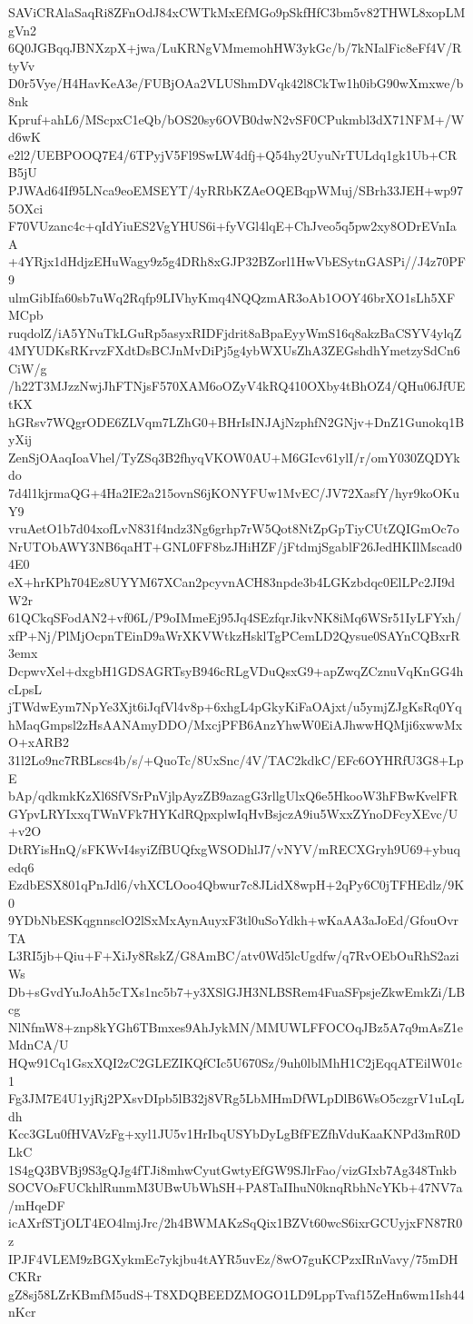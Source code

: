 SAViCRAlaSaqRi8ZFnOdJ84xCWTkMxEfMGo9pSkfHfC3bm5v82THWL8xopLMgVn2
6Q0JGBqqJBNXzpX+jwa/LuKRNgVMmemohHW3ykGc/b/7kNIalFic8eFf4V/RtyVv
D0r5Vye/H4HavKeA3e/FUBjOAa2VLUShmDVqk42l8CkTw1h0ibG90wXmxwe/b8nk
Kpruf+ahL6/MScpxC1eQb/bOS20sy6OVB0dwN2vSF0CPukmbl3dX71NFM+/Wd6wK
e2l2/UEBPOOQ7E4/6TPyjV5Fl9SwLW4dfj+Q54hy2UyuNrTULdq1gk1Ub+CRB5jU
PJWAd64If95LNca9eoEMSEYT/4yRRbKZAeOQEBqpWMuj/SBrh33JEH+wp975OXci
F70VUzanc4c+qIdYiuES2VgYHUS6i+fyVGl4lqE+ChJveo5q5pw2xy8ODrEVnIaA
+4YRjx1dHdjzEHuWagy9z5g4DRh8xGJP32BZorl1HwVbESytnGASPi//J4z70PF9
ulmGibIfa60sb7uWq2Rqfp9LIVhyKmq4NQQzmAR3oAb1OOY46brXO1sLh5XFMCpb
ruqdolZ/iA5YNuTkLGuRp5asyxRIDFjdrit8aBpaEyyWmS16q8akzBaCSYV4ylqZ
4MYUDKsRKrvzFXdtDsBCJnMvDiPj5g4ybWXUsZhA3ZEGshdhYmetzySdCn6CiW/g
/h22T3MJzzNwjJhFTNjsF570XAM6oOZyV4kRQ410OXby4tBhOZ4/QHu06JfUEtKX
hGRsv7WQgrODE6ZLVqm7LZhG0+BHrIsINJAjNzphfN2GNjv+DnZ1Gunokq1ByXij
ZenSjOAaqIoaVhel/TyZSq3B2fhyqVKOW0AU+M6GIcv61ylI/r/omY030ZQDYkdo
7d4l1kjrmaQG+4Ha2IE2a215ovnS6jKONYFUw1MvEC/JV72XasfY/hyr9koOKuY9
vruAetO1b7d04xofLvN831f4ndz3Ng6grhp7rW5Qot8NtZpGpTiyCUtZQIGmOc7o
NrUTObAWY3NB6qaHT+GNL0FF8bzJHiHZF/jFtdmjSgablF26JedHKIlMscad04E0
eX+hrKPh704Ez8UYYM67XCan2pcyvnACH83npde3b4LGKzbdqc0ElLPc2JI9dW2r
61QCkqSFodAN2+vf06L/P9oIMmeEj95Jq4SEzfqrJikvNK8iMq6WSr51IyLFYxh/
xfP+Nj/PlMjOcpnTEinD9aWrXKVWtkzHsklTgPCemLD2Qysue0SAYnCQBxrR3emx
DcpwvXel+dxgbH1GDSAGRTsyB946cRLgVDuQsxG9+apZwqZCznuVqKnGG4hcLpsL
jTWdwEym7NpYe3Xjt6iJqfVl4v8p+6xhgL4pGkyKiFaOAjxt/u5ymjZJgKsRq0Yq
hMaqGmpsl2zHsAANAmyDDO/MxcjPFB6AnzYhwW0EiAJhwwHQMji6xwwMxO+xARB2
31l2Lo9nc7RBLscs4b/s/+QuoTc/8UxSnc/4V/TAC2kdkC/EFc6OYHRfU3G8+LpE
bAp/qdkmkKzXl6SfVSrPnVjlpAyzZB9azagG3rllgUlxQ6e5HkooW3hFBwKvelFR
GYpvLRYIxxqTWnVFk7HYKdRQpxplwIqHvBsjczA9iu5WxxZYnoDFcyXEvc/U+v2O
DtRYisHnQ/sFKWvI4syiZfBUQfxgWSODhlJ7/vNYV/mRECXGryh9U69+ybuqedq6
EzdbESX801qPnJdl6/vhXCLOoo4Qbwur7c8JLidX8wpH+2qPy6C0jTFHEdlz/9K0
9YDbNbESKqgnnsclO2lSxMxAynAuyxF3tl0uSoYdkh+wKaAA3aJoEd/GfouOvrTA
L3RI5jb+Qiu+F+XiJy8RskZ/G8AmBC/atv0Wd5lcUgdfw/q7RvOEbOuRhS2aziWs
Db+sGvdYuJoAh5cTXs1nc5b7+y3XSlGJH3NLBSRem4FuaSFpsjeZkwEmkZi/LBcg
NlNfmW8+znp8kYGh6TBmxes9AhJykMN/MMUWLFFOCOqJBz5A7q9mAsZ1eMdnCA/U
HQw91Cq1GsxXQI2zC2GLEZIKQfCIc5U670Sz/9uh0lblMhH1C2jEqqATEilW01c1
Fg3JM7E4U1yjRj2PXsvDIpb5lB32j8VRg5LbMHmDfWLpDlB6WsO5czgrV1uLqLdh
Kcc3GLu0fHVAVzFg+xyl1JU5v1HrIbqUSYbDyLgBfFEZfhVduKaaKNPd3mR0DLkC
1S4gQ3BVBj9S3gQJg4fTJi8mhwCyutGwtyEfGW9SJlrFao/vizGIxb7Ag348Tnkb
SOCVOsFUCkhlRunmM3UBwUbWhSH+PA8TaIIhuN0knqRbhNcYKb+47NV7a/mHqeDF
icAXrfSTjOLT4EO4lmjJrc/2h4BWMAKzSqQix1BZVt60wcS6ixrGCUyjxFN87R0z
IPJF4VLEM9zBGXykmEc7ykjbu4tAYR5uvEz/8wO7guKCPzxIRnVavy/75mDHCKRr
gZ8sj58LZrKBmfM5udS+T8XDQBEEDZMOGO1LD9LppTvaf15ZeHn6wm1Ish44nKcr
